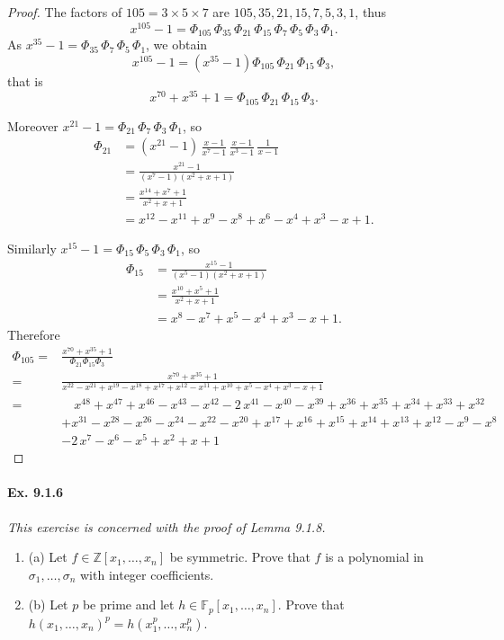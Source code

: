 \documentclass[11pt,a4paper]{article}
\newcommand{\be} {\begin{enumerate}}
\newcommand{\ee} {\end{enumerate}}
\newcommand{\Z}{\mathbb{Z}}
\newcommand{\F}{\mathbb{F}}
\begin{document}
\begin{proof}
The factors of $105 = 3\times5\times7$ are $105,35,21,15,7,5,3,1$, thus
$$x^{105} - 1 = \Phi_{105}\,\Phi_{35}\,\Phi_{21}\,\Phi_{15}\, \Phi_7\, \Phi_5\,\Phi_3\,\Phi_1.$$
As $x^{35}-1 = \Phi_{35}\, \Phi_7\, \Phi_5\, \Phi_1$, we obtain
$$x^{105}-1 = (x^{35}-1)\Phi_{105}\, \Phi_{21}\, \Phi_{15}\, \Phi_3,$$
that is
$$x^{70} + x^{35}+1 = \Phi_{105}\,\Phi_{21}\, \Phi_{15}\, \Phi_3.$$

Moreover $x^{21} - 1 = \Phi_{21}\,  \Phi_7\, \Phi_3\, \Phi_1$, so
\begin{align*}
\Phi_{21} &= (x^{21}-1)\, \frac{x-1}{x^7-1}\, \frac{x-1}{x^3-1}\, \frac{1}{x-1}\\
&= \frac{x^{21}-1}{(x^7-1)(x^2+x+1)}\\
&=\frac{x^{14} +x^7+1}{x^2+x+1}\\
&=x^{12} - x^{11} + x^9 -x^8 +x^6 -x^4 +x^3 -x+1.
\end{align*}

Similarly $x^{15}-1 = \Phi_{15}\,  \Phi_5\, \Phi_3\, \Phi_1$, so
\begin{align*}
\Phi_{15} &= \frac{x^{15}-1}{(x^5-1)(x^2+x+1)}\\
&=\frac{x^{10} +x^5+1}{x^2+x+1}\\
&=x^8 -x^7+x^5 -x^4+x^3 -x+1.
\end{align*}
Therefore
\begin{align*}
\Phi_{105} =& \frac{x^{70} + x^{35} + 1}{\Phi_{21} \Phi_{15} \Phi_3} \\
=& \frac{x^{70} + x^{35} + 1}{x^{22} - x^{21} + x^{19} - x^{18} + x^{17} + x^{12} - x^{11} + x^{10} + x^{5} - x^{4} + x^{3} - x + 1}\\
=&\quad x^{48} + x^{47} + x^{46} - x^{43} - x^{42} - 2 \, x^{41} - x^{40} - x^{39} + x^{36} + x^{35} + x^{34} + x^{33} + x^{32}\\
& + x^{31}- x^{28} - x^{26} - x^{24} - x^{22} - x^{20} + x^{17} + x^{16} + x^{15} + x^{14} + x^{13} + x^{12} - x^{9} - x^{8} \\
&- 2 \, x^{7} - x^{6} - x^{5} + x^{2} + x + 1
\end{align*}
\end{proof}

\paragraph{Ex. 9.1.6}

{\it This exercise is concerned with the proof of Lemma 9.1.8.
\be
\item[(a)] Let $f\in \Z[x_1,\ldots,x_n]$ be symmetric. Prove that $f$ is a polynomial in $\sigma_1,\ldots,\sigma_n$ with integer coefficients.
\item[(b)] Let $p$ be prime and let $h \in \F_p[x_1,\ldots,x_n]$. Prove that $h(x_1,\ldots,x_n)^p = h(x_1^p,\ldots,x_n^p)$.
\ee
}
\end{document}
